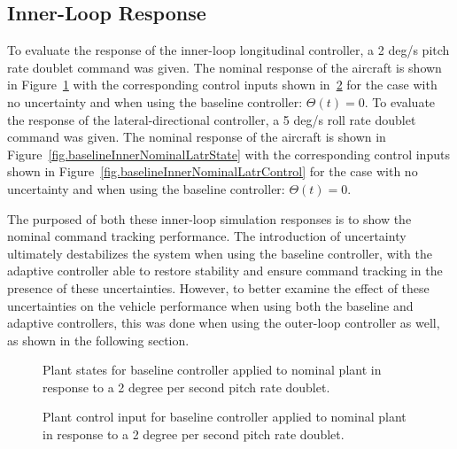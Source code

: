 \subsection{Inner-Loop Response}\label{sec.numericalExample.innerLoop}

To evaluate the response of the inner-loop longitudinal controller, a 2 deg/s pitch rate doublet command was given.
The nominal response of the aircraft is shown in Figure~\ref{fig.baselineInnerNominalLongState} with the corresponding control inputs shown in~\ref{fig.baselineInnerNominalLongControl} for the case with no uncertainty and when using the baseline controller: $\Theta(t)=0$.
To evaluate the response of the lateral-directional controller, a 5 deg/s roll rate doublet command was given.
The nominal response of the aircraft is shown in Figure~\ref{fig.baselineInnerNominalLatrState} with the corresponding control inputs shown in Figure~\ref{fig.baselineInnerNominalLatrControl} for the case with no uncertainty and when using the baseline controller: $\Theta(t)=0$.

The purposed of both these inner-loop simulation responses is to show the nominal command tracking performance.
The introduction of uncertainty ultimately destabilizes the system when using the baseline controller, with the adaptive controller able to restore stability and ensure command tracking in the presence of these uncertainties.
However, to better examine the effect of these uncertainties on the vehicle performance when using both the baseline and adaptive controllers, this was done when using the outer-loop controller as well, as shown in the following section.

\newpage
\begin{figure}[H]
  \hspace{-0.5in}
  \noindent{}
  \vspace{-1.0in}
  \caption{Plant states for baseline controller applied to nominal plant in response to a 2 degree per second pitch rate doublet.\label{fig.baselineInnerNominalLongState}}
\end{figure}

\newpage
\begin{figure}[H]
  \hspace{-0.5in}
  \noindent{}
  \vspace{-1.0in}
  \caption{Plant control input for baseline controller applied to nominal plant in response to a 2 degree per second pitch rate doublet.\label{fig.baselineInnerNominalLongControl}}
\end{figure}

